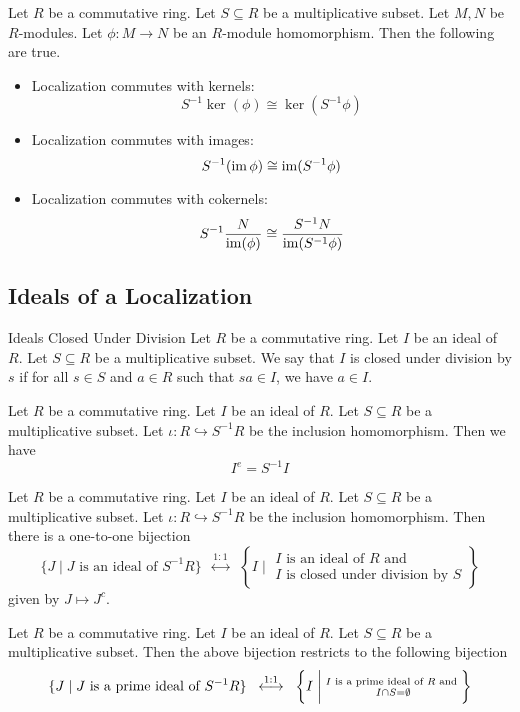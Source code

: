 \documentclass[a4paper]{article}
\begin{document}
\begin{lmm}{}{} Let $R$ be a commutative ring. Let $S\subseteq R$ be a multiplicative subset. Let $M,N$ be $R$-modules. Let $\phi:M\to N$ be an $R$-module homomorphism. Then the following are true. 
\begin{itemize}
\item Localization commutes with kernels: $$S^{-1}\ker(\phi)\cong\ker(S^{-1}\phi)$$
\item Localization commutes with images: $$S^{-1}(\operatorname{im}\phi)\cong\operatorname{im}(S^{-1}\phi)$$
\item Localization commutes with cokernels: $$S^{-1}\frac{N}{\operatorname{im}(\phi)}\cong\frac{S^{-1}N}{\operatorname{im}(S^{-1}\phi)}$$
\end{itemize}
\end{lmm}

\subsection{Ideals of a Localization}
\begin{defn}{Ideals Closed Under Division}{} Let $R$ be a commutative ring. Let $I$ be an ideal of $R$. Let $S\subseteq R$ be a multiplicative subset. We say that $I$ is closed under division by $s$ if for all $s\in S$ and $a\in R$ such that $sa\in I$, we have $a\in I$. 
\end{defn}

\begin{lmm} Let $R$ be a commutative ring. Let $I$ be an ideal of $R$. Let $S\subseteq R$ be a multiplicative subset. Let $\iota:R\hookrightarrow S^{-1}R$ be the inclusion homomorphism. Then we have $$I^e=S^{-1}I$$
\end{lmm}

\begin{thm}{}{} Let $R$ be a commutative ring. Let $I$ be an ideal of $R$. Let $S\subseteq R$ be a multiplicative subset. Let $\iota:R\hookrightarrow S^{-1}R$ be the inclusion homomorphism. Then there is a one-to-one bijection $$\{J\;|\;J\text{ is an ideal of }S^{-1}R\}\;\;\overset{1:1}{\longleftrightarrow}\;\;\left\{I\;|\;\substack{I\text{ is an ideal of }R\text{ and }\\I\text{ is closed under division by }S}\right\}$$ given by $J\mapsto J^c$. 
\end{thm}

\begin{prp}{}{} Let $R$ be a commutative ring. Let $I$ be an ideal of $R$. Let $S\subseteq R$ be a multiplicative subset. Then the above bijection restricts to the following bijection $$\{J\;|\;J\text{ is a prime ideal of }S^{-1}R\}\;\;\overset{1:1}{\longleftrightarrow}\;\;\left\{I\;\bigg{|}\;\substack{I\text{ is a prime ideal of }R\text{ and }\\I\cap S=\emptyset}\right\}$$
\end{prp}
\end{document}
